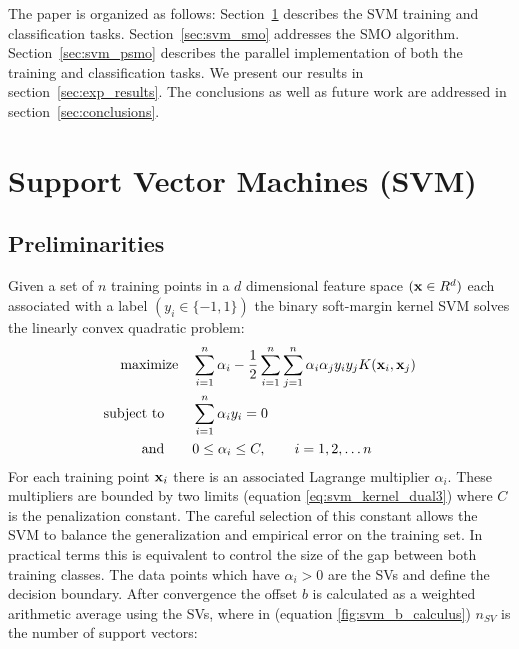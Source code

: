 \documentclass{llncs}
\begin{document}
The paper is organized as follows: Section~\ref{sec:svm} describes the \ac{SVM} training and classification tasks. Section~\ref{sec:svm_smo} addresses the \ac{SMO} algorithm. Section~\ref{sec:svm_psmo} describes the parallel implementation of both the training and classification tasks. We present our results in section~\ref{sec:exp_results}. The conclusions as well as future work are addressed in section~\ref{sec:conclusions}.

\section{Support Vector Machines (SVM)}
\label{sec:svm}
\subsection{Preliminarities}
\label{sec:svm_formulation}
Given a set of $n$ training points in a $d$ dimensional feature space $({\mathbf x} \in R^d)$ each associated with a label $(y_i \in \{-1, 1\})$ the binary soft-margin kernel \ac{SVM} solves the linearly convex quadratic problem:
\begin{align}
	\label{eq:svm_kernel_dual1} \text{maximize} \quad & \sum\limits_{i=1}^{n} \alpha_i - \frac{1}{2} \sum\limits_{i=1}^{n} \sum\limits_{j=1}^{n} \alpha_i\alpha_j y_i y_j K({\mathbf x}_i,{\mathbf x}_j) \\
	\label{eq:svm_kernel_dual2} \text{subject to} \qquad & \sum\limits_{i=1}^{n} \alpha_i y_i = 0 \\
	\label{eq:svm_kernel_dual3} \text{and} \qquad & 0 \leq \alpha_i \leq C, \qquad i=1,2,\dots n
\end{align}
For each training point ${\mathbf x}_i$ there is an associated Lagrange multiplier $\alpha_i$. These multipliers are bounded by two limits (equation \ref{eq:svm_kernel_dual3}) where $C$ is the penalization constant. The careful selection of this constant allows the \ac{SVM} to balance the generalization  and empirical error on the training set. In practical terms this is equivalent to control the size of the gap between both training classes. The data points which have $\alpha_i > 0$ are the \acp{SV} and define the decision boundary. After convergence the offset $b$ is calculated as a weighted arithmetic average using the SVs, where in (equation \ref{fig:svm_b_calculus}) $n_{SV}$ is the number of support vectors:
\end{document}
